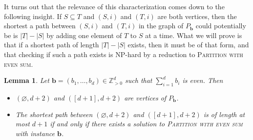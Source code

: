\documentclass[centering,11pt,reqno]{amsart}
\newtheorem{lem}[theorem]{Lemma}
\theoremstyle{definition}
\renewcommand{\emptyset}{\varnothing}
\newcommand{\NP}{\textsc{NP}}
\begin{document}
It turns out that the relevance of this characterization comes down to the following insight. If $S \subseteq T$ and $(S,i)$ and $(T,i)$ are both vertices, then the shortest a path between $(S,i)$ and $(T,i)$ in the graph of $P_\mathbf{b}$ could potentially be is $|T| - |S|$ by adding one element of $T$ to $S$ at a time. What we will prove is that if a shortest path of length $|T| - |S|$ exists, then it must be of that form, and that checking if such a path exists is \NP-hard by a reduction to \textsc{Partition with even sum}.

\begin{lem}
\label{lem:partitionreduction}
Let $\mathbf{b}=(b_1,\ldots,b_d)\in \mathbb{Z}_ {>0}^d$ such that $\sum_{i=1}^{d}{b_i}$ is even. Then
\begin{itemize}
    \item $(\emptyset,d+2)$ and $([d+1],d+2)$ are vertices of $P_{\mathbf{b}}$. 
    \item The shortest path between $(\emptyset,d+2)$ and $([d+1],d+2)$ is of length at most $d+1$ if and only if there exists a solution to \textsc{Partition  with even sum} with instance $\mathbf{b}$.
\end{itemize}

\end{lem}
\end{document}
